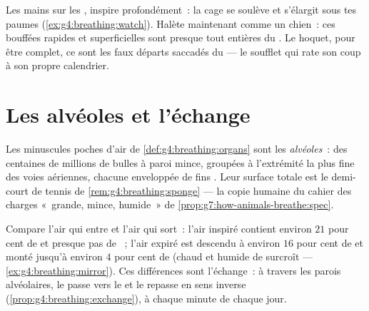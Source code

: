 \begin{example}\label{ex:g7:lungs-and-gas-exchange:feel}
Les mains sur les , inspire profondément~: la cage se soulève
et s'élargit sous tes paumes (\cref{ex:g4:breathing:watch}).
Halète maintenant comme un chien~: ces bouffées rapides et
superficielles sont presque tout entières du . Le hoquet,
pour être complet, ce sont les faux départs saccadés du 
--- le soufflet qui rate son coup à son propre calendrier.
\end{example}

\section{Les alvéoles et l'échange}

\begin{definition}[Alvéoles]\label{def:g7:lungs-and-gas-exchange:alveoli}
Les minuscules poches d'air de \cref{def:g4:breathing:organs} sont
les \emph{alvéoles}~: des centaines de millions de
bulles à paroi mince, groupées à l'extrémité la plus fine des voies
aériennes, chacune enveloppée de fins . Leur
surface totale est le demi-court de tennis de
\cref{rem:g4:breathing:sponge} --- la copie humaine du cahier des
charges «~grande, mince, humide~» de
\cref{prop:g7:how-animals-breathe:spec}.
\end{definition}

\begin{proposition}\label{prop:g7:lungs-and-gas-exchange:numbers}
Compare l'air qui entre et l'air qui sort~: l'air inspiré contient
environ $21$ pour cent de  et presque pas de ~; l'air expiré est descendu à environ $16$ pour cent de
 et monté jusqu'à environ $4$ pour cent de  (chaud et humide de surcroît ---
\cref{ex:g4:breathing:mirror}). Ces différences sont l'échange~: à
travers les parois alvéolaires, le  passe vers le  et
le  repasse en sens inverse
(\cref{prop:g4:breathing:exchange}), à chaque minute de chaque jour.
\end{proposition}
\admitted

